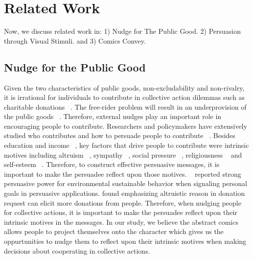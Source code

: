\section{Related Work}
\label{sec:relatedwork}
Now, we discuss related work in: 1) Nudge for The Public Good. 2) Persuasion through Visual Stimuli. and 3) Comics Convey.

\subsection{Nudge for the Public Good}

Given the two characteristics of public goods, non-excludability and non-rivalry, it is irrational for individuals to contribute in collective action dilemmas such as charitable donations ~\cite{marwell1981economists,isaac1982public}. The free-rider problem will result in an underprovision of the public goods ~\cite{marwell1981economists,marwell1979experiments,isaac1982public}. Therefore, external nudges play an important role in encouraging people to contribute. Researchers and policymakers have extensively studied who contributes and how to persuade people to contribute ~\cite{olson2009logic,becker1974theory,andreoni1990impure}. Besides education and income ~\cite{pessemier1977willingness,burnett1981psychographic}, key factors that drive people to contribute were intrinsic motives including altruism ~\cite{olson2009logic,andreoni1990impure}, sympathy ~\cite{becker1974theory}, social pressure ~\cite{miguel2005ethnic}, religiousness ~\cite{pessemier1977willingness,burnett1981psychographic} and self-esteem ~\cite{burnett1981psychographic}. Therefore, to construct effective persuasive messages, it is important to make the persuadee reflect upon those motives.  ~\textcite{midden2008using} reported strong persuasive power for environmental sustainable behavior when signaling personal goals in persuasive applications. \textcite{feiler2012mixed} found emphasizing altruistic reason in donation request can elicit more donations from people. Therefore, when nudging people for collective actions, it is important to make the persuadee reflect upon their intrinsic motives in the messages. In our study, we believe the abstract comics allows people to project themselves onto the character which gives us the oppurtunities to nudge them to reflect upon their intrinsic motives when making decisions about cooperating in collective actions. 

